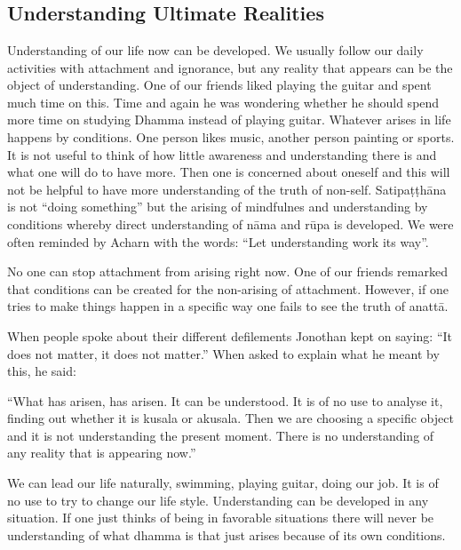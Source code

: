 {\chapter[Understanding Ultimate Realities]{}
\section*{Understanding Ultimate Realities}


Understanding of our life now can be developed. We usually
follow our daily activities with attachment and ignorance, but any
reality that appears can 
be the object of understanding. One of our friends liked
playing the guitar and spent much time on this. Time and again he was
wondering whether he should spend more time on studying Dhamma instead
of playing guitar. Whatever arises in life happens by conditions. One
person likes music, another person painting or sports. It is not useful
to think of how little awareness and understanding there is and what one
will do to have more. Then one is concerned about oneself and this will
not be helpful to have more understanding of the truth of non-self.
Satipaṭṭhāna is not ``doing something'' but the arising of mindfulnes
and understanding by conditions whereby
direct understanding of
nāma and rūpa
is developed. We were often reminded by Acharn with the words: ``Let
understanding work its way''.

No one can stop attachment from arising right now. One of our
friends remarked that conditions can be created for the non-arising of
attachment. However, if one tries to make things happen in a specific
way one fails to see the truth of anattā. 

When people spoke about their different defilements Jonothan
kept on saying: ``It does not matter, it does not matter.'' When asked
to explain what he meant by this, he said: 

``What has arisen, has arisen. It can be understood. It is of
no use to analyse it, finding out whether it is kusala or akusala. Then
we are choosing a specific object and it is not understanding the
present moment. There is no understanding of any reality that is
appearing now.''

We can lead our life naturally, swimming, playing guitar,
doing our job. It is of no use to try to change our life style.
Understanding can be developed in any situation. If one just thinks of
being in favorable situations there will never be understanding of what
dhamma is that just arises because of its own conditions. 

}
